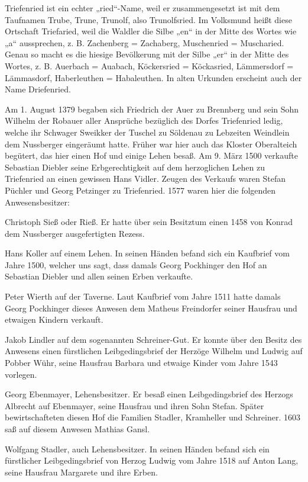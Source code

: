 \documentclass[12pt,a4pager]{book}
\begin{document}
Triefenried ist ein echter „ried“-Name, weil er zusammengesetzt ist mit dem
Taufnamen Trube, Trune, Trunolf, also Trunolfsried. Im Volksmund heißt diese
Ortschaft Triefaried, weil die Waldler die Silbe „en“ in der Mitte des Wortes
wie „a“ aussprechen, z. B. Zachenberg = Zachaberg, Muschenried = Muscharied.
Genau so macht es die hiesige Bevölkerung mit der Silbe „er“ in der Mitte des
Wortes, z. B. Auerbach = Auabach, Köckersried = Köckasried, Lämmersdorf =
Lämmasdorf, Haberleuthen = Habaleuthen. In alten Urkunden erscheint auch der
Name Driefenried.

Am 1. August 1379 begaben sich Friedrich der Auer zu Brennberg und sein Sohn
Wilhelm der Robauer aller Ansprüche bezüglich des Dorfes Triefenried ledig,
welche ihr Schwager Sweikker der Tuschel zu Söldenau zu Lebzeiten Weindlein dem
Nussberger eingeräumt hatte. Früher war hier auch das Kloster Oberalteich
begütert, das hier einen Hof und einige Lehen besaß. Am 9. März 1500 verkaufte
Sebastian Diebler seine Erbgerechtigkeit auf dem herzoglichen Lehen zu
Triefenried an einen gewissen Hans Vidler. Zeugen des Verkaufs waren Stefan
Püchler und Georg Petzinger zu Triefenried. 1577 waren hier die folgenden
Anwesensbesitzer:

Christoph Sieß oder Rieß. Er hatte über sein Besitztum einen 1458 von Konrad dem
Nussberger ausgefertigten Rezess.

Hans Koller auf einem Lehen. In seinen Händen befand sich ein Kaufbrief vom
Jahre 1500, welcher uns sagt, dass damals Georg Pockhinger den Hof an Sebastian
Diebler und allen seinen Erben verkaufte.

Peter Wierth auf der Taverne. Laut Kaufbrief vom Jahre 1511 hatte damals Georg
Pockhinger dieses Anwesen dem Matheus Freindorfer seiner Hausfrau und etwaigen
Kindern verkauft.

Jakob Lindler auf dem sogenannten Schreiner-Gut. Er konnte über den Besitz des
Anwesens einen fürstlichen Leibgedingsbrief der Herzöge Wilhelm und Ludwig auf
Pobber Wühr, seine Hausfrau Barbara und etwaige Kinder vom Jahre 1543 vorlegen.

Georg Ebenmayer, Lehensbesitzer. Er besaß einen Leibgedingsbrief des Herzogs
Albrecht auf Ebenmayer, seine Hausfrau und ihren Sohn Stefan. Später
bewirtschafteten diesen Hof die Familien Stadler, Kramheller und Schreiner. 1603
saß auf diesem Anwesen Mathias Gansl.

Wolfgang Stadler, auch Lehensbesitzer. In seinen Händen befand sich ein
fürstlicher Leibgedingsbrief von Herzog Ludwig vom Jahre 1518 auf Anton Lang,
seine Hausfrau Margarete und ihre Erben.
\end{document}
